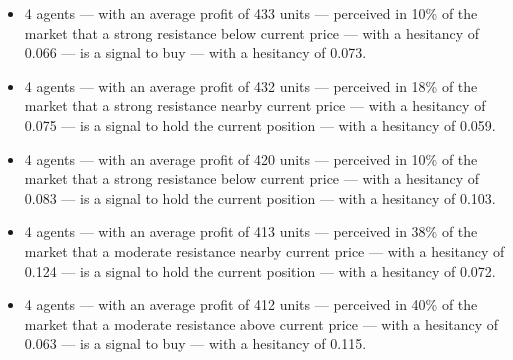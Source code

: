 {\small
  \begin{itemize}
  \item 4 agents — with an average profit of 433 units — perceived in 10\% of
    the market that a strong resistance below current price — with a hesitancy
    of 0.066 — is a signal to buy — with a hesitancy of 0.073.
  \item 4 agents — with an average profit of 432 units — perceived in 18\% of the
    market that a strong resistance nearby current price — with a hesitancy of
    0.075 — is a signal to hold the current position — with a hesitancy of 0.059.
  \item 4 agents — with an average profit of 420 units — perceived in 10\% of the
    market that a strong resistance below current price — with a hesitancy of
    0.083 — is a signal to hold the current position — with a hesitancy of 0.103.
  \item 4 agents — with an average profit of 413 units — perceived in 38\% of the
    market that a moderate resistance nearby current price — with a hesitancy of
    0.124 — is a signal to hold the current position — with a hesitancy of 0.072.
  \item 4 agents — with an average profit of 412 units — perceived in 40\% of the
    market that a moderate resistance above current price — with a hesitancy of
    0.063 — is a signal to buy — with a hesitancy of 0.115.
  \end{itemize}
}
